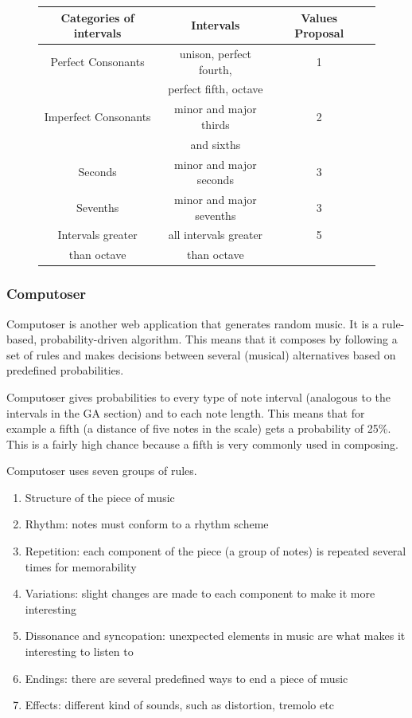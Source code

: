 \documentclass[12pt]{article}
\begin{document}
\begin{figure}
\begin{tabular}{| c | c | c | c |}
\hline
\textbf{Categories of intervals} & \textbf{Intervals} & \textbf{Values Proposal} \\
\hline
Perfect Consonants & unison, perfect fourth, & 1  \\ 
& perfect fifth, octave & \\
\hline
Imperfect Consonants & minor and major thirds & 2 \\
& and sixths & \\
\hline
Seconds & minor and major seconds & 3 \\
 \hline
Sevenths & minor and major sevenths & 3 \\
\hline
Intervals greater & all intervals greater & 5 \\
than octave & than octave & \\

\hline
\end{tabular}
\end{figure}

\newpage

\subsubsection{Computoser}

Computoser is another web application that generates random music. It is a rule-based, probability-driven algorithm. This means that it composes by following a set of rules and makes decisions between several (musical) alternatives based on predefined probabilities.
\newline

Computoser gives probabilities to every type of note interval (analogous to the intervals in the GA section) and to each note length.
This means that for example a fifth (a distance of five notes in the scale) gets a probability of 25\%. This is a fairly high chance because a fifth is very commonly used in composing.
\newline

Computoser uses seven groups of rules.
\begin{enumerate}
\item Structure of the piece of music 
\item Rhythm: notes must conform to a rhythm scheme
\item Repetition: each component of the piece (a group of notes) is repeated several times for memorability 
\item Variations: slight changes are made to each component to make it more interesting
\item Dissonance and syncopation: unexpected elements in music are what makes it interesting to listen to
\item Endings: there are several predefined ways to end a piece of music
\item Effects: different kind of sounds, such as distortion, tremolo etc
\end{enumerate}
\end{document}
